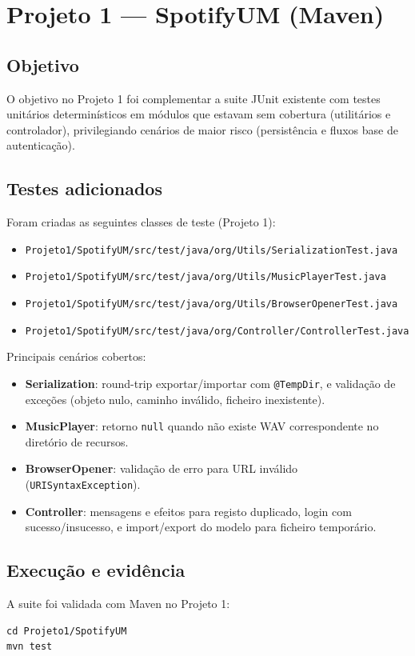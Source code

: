 \documentclass{article}
\begin{document}
\section{Projeto 1 — SpotifyUM (Maven)}
\subsection{Objetivo}
O objetivo no Projeto 1 foi complementar a suite JUnit existente com testes unitários determinísticos em módulos que estavam sem cobertura (utilitários e controlador), privilegiando cenários de maior risco (persistência e fluxos base de autenticação).

\subsection{Testes adicionados}
Foram criadas as seguintes classes de teste (Projeto 1):
\begin{itemize}
    \item \texttt{Projeto1/SpotifyUM/src/test/java/org/Utils/SerializationTest.java}
    \item \texttt{Projeto1/SpotifyUM/src/test/java/org/Utils/MusicPlayerTest.java}
    \item \texttt{Projeto1/SpotifyUM/src/test/java/org/Utils/BrowserOpenerTest.java}
    \item \texttt{Projeto1/SpotifyUM/src/test/java/org/Controller/ControllerTest.java}
\end{itemize}

Principais cenários cobertos:
\begin{itemize}
    \item \textbf{Serialization}: round-trip exportar/importar com \texttt{@TempDir}, e validação de exceções (objeto nulo, caminho inválido, ficheiro inexistente).
    \item \textbf{MusicPlayer}: retorno \texttt{null} quando não existe WAV correspondente no diretório de recursos.
    \item \textbf{BrowserOpener}: validação de erro para URL inválido (\texttt{URISyntaxException}).
    \item \textbf{Controller}: mensagens e efeitos para registo duplicado, login com sucesso/insucesso, e import/export do modelo para ficheiro temporário.
\end{itemize}

\subsection{Execução e evidência}
A suite foi validada com Maven no Projeto 1:
\begin{lstlisting}[caption={Execução da suite de testes do Projeto 1 (Maven)},label={lst:proj1-mvn-test}]
cd Projeto1/SpotifyUM
mvn test
\end{lstlisting}
\end{document}
